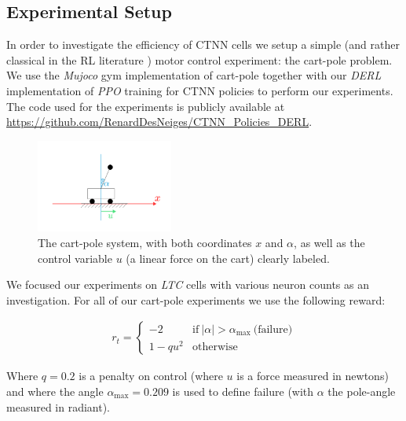 \subsection{Experimental Setup}

In order to investigate the efficiency of CTNN cells we setup a simple (and rather classical in the RL literature \cite{cartpoleSutton}) motor control experiment: the cart-pole problem. We use the \textit{Mujoco} gym implementation of cart-pole together with our \textit{DERL} implementation of \textit{PPO} training for CTNN policies to perform our experiments. The code used for the experiments is publicly available at \url{https://github.com/RenardDesNeiges/CTNN_Policies_DERL}.\\

\begin{figure}[h!]
    \centering
    \includegraphics[width=0.4\textwidth]{figures/cartpole.pdf}
    \caption{The cart-pole system, with both coordinates $x$ and $\alpha$, as well as the control variable $u$ (a linear force on the cart) clearly labeled.}
\end{figure}

We focused our experiments on \textit{LTC} cells with various neuron counts as an investigation. For all of our cart-pole experiments we use the following reward: 

\begin{align*}
    r_t = 
    \begin{cases}
        -2 & \text{if} ~|\alpha|>\alpha_\text{max} ~\text{(failure)}\\
        1-q u^2 & \text{otherwise} 
    \end{cases}
\end{align*}

Where $q=0.2$ is a penalty on control (where $u$ is a force measured in newtons) and where the angle $\alpha_\text{max}=0.209$ is used to define failure (with $\alpha$ the pole-angle measured in radiant).  \\

